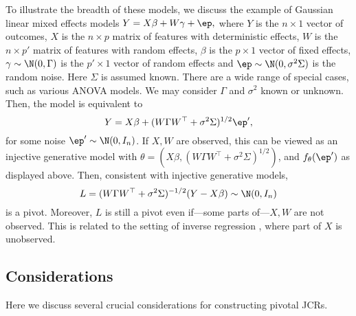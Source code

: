 \documentclass[english]{article}
\begin{document}
To illustrate the breadth of these models, we discuss
the example of 
Gaussian linear mixed effects models
$Y = X\beta + W\gamma +\ep,$
where $Y$ is the $n\times 1$ vector of outcomes, $X$ is the $n\times p$  matrix of  features with deterministic effects, 
$W$ is the $n \times p'$  matrix of features with random effects, 
$\beta$ is the $p\times 1$ vector of fixed effects,
$\gamma \sim \N(0,\Gamma)$ is the $p'\times 1$ vector of random effects 
and $\ep\sim \N(0,\sigma^2 \Sigma)$ is the random noise.
Here $\Sigma$ is assumed known.
There are a wide range of special cases, such as various ANOVA models.
We may consider $\Gamma $ and $\sigma^2$ known or unknown.
Then, the model is equivalent to 
$$Y = X\beta + (W\Gamma W^\top+\sigma^2 \Sigma)^{1/2}\ep',$$
for some noise $\ep'\sim \N(0,I_n)$.
If $X,W$ are observed, 
this can be viewed as an injective generative model with $\theta = (X\beta,  (W\Gamma W^\top+\sigma^2 \Sigma)^{1/2})$, and $f_\theta(\ep')$ as displayed above.
Then, consistent with injective generative models,
$$L = (W\Gamma W^\top+\sigma^2 \Sigma)^{-1/2}(Y -X\beta)\sim \N(0,I_n)$$
is a pivot.
Moreover, $L$ is still a pivot even if---some parts of---$X,W$ are not observed. 
This is related to the setting of inverse regression \citep{williams1959regression,krutchkoff1967classical}, where part of $X$ is unobserved. 



\subsection{Considerations}
\label{cons}
Here we discuss several crucial considerations for constructing pivotal JCRs.

\end{document}
